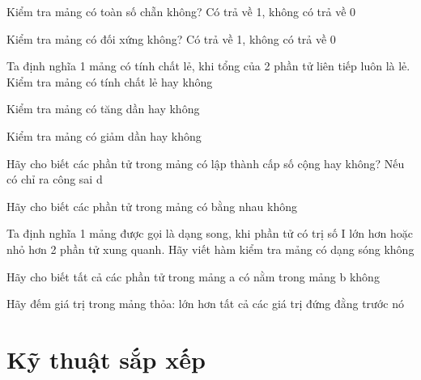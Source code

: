 \begin{problem}
    Kiểm tra mảng có toàn số chẵn không? Có trả về 1, không có trả về 0
\end{problem}
\begin{problem}
    Kiểm tra mảng có đối xứng không? Có trả về 1, không có trả về 0
\end{problem}
\begin{problem}
    Ta định nghĩa 1 mảng có tính chất lẻ, khi tổng của 2 phần tử liên tiếp luôn là lẻ. Kiểm tra mảng có tính chất lẻ hay không
\end{problem}
\begin{problem}
    Kiểm tra mảng có tăng dần hay không
\end{problem}
\begin{problem}
    Kiểm tra mảng có giảm dần hay không
\end{problem}
\begin{problem}
    Hãy cho biết các phần tử trong mảng có lập thành cấp số cộng hay không? Nếu có chỉ ra công sai d
\end{problem}
\begin{problem}
    Hãy cho biết các phần tử trong mảng có bằng nhau không
\end{problem}
\begin{problem}
    Ta định nghĩa 1 mảng được gọi là dạng song, khi phần tử có trị số I lớn hơn hoặc nhỏ hơn 2 phần tử xung quanh. Hãy viết hàm kiểm tra mảng có dạng sóng không
\end{problem}
\begin{problem}
    Hãy cho biết tất cả các phần tử trong mảng a có nằm trong mảng b không
\end{problem}
\begin{problem}
    Hãy đếm giá trị trong mảng thỏa: lớn hơn tất cả các giá trị đứng đằng trước nó
\end{problem}

\section{Kỹ thuật sắp xếp}

